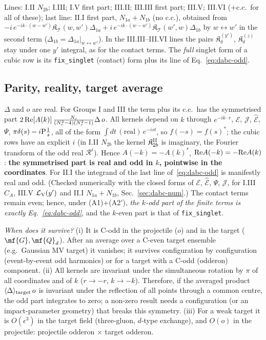 Lines: I.II $N_{2b}$; I.III; I.V first part; III.II; III.III first part; III.V; III.VI ($+$c.c.\ for all of these); last line: II.I first part, $N_{1a}+N_{1b}$ (no c.c.), obtained from $-i\,e^{-ik\cdot(w-w')}\mathfrak{K}_{\mathcal{T}}(w,w')\Delta_{1a}+i\,e^{-ik\cdot(w-w')}\mathfrak{K}_{\mathcal{T}}(w',w)\Delta_{1b}$ by $w\leftrightarrow w'$ in the second term ($\Delta_{1b}=\Delta_{1a}|_{w\leftrightarrow w'}$). In the III.III--III.VI lines the pairs $\mathfrak{K}^{(y')}_{\delta}$, $\mathfrak{K}^{(z)}_{\delta}$ stay under one $y'$ integral, as for the contact terms. The \emph{full} singlet form of a cubic row is its \texttt{fix\_singlet} (contact) form plus its line of Eq.~\eqref{eq:dabc-odd}.

\subsection{Parity, reality, target average}\label{sec:dabc-parity}
\noindent $\Delta$ and $o$ are real. For Groups I and III the term plus its c.c.\ has the symmetrised part $2\,{\rm Re}[A(k)]\,\frac{N_{c}}{(N_{c}^{2}-4)(N_{c}^{2}-1)}\Delta\,o$. All kernels depend on $k$ through $e^{-ik\cdot r}$, $\mathcal{E}$, $\mathcal{J}$, $\widehat{\mathcal{E}}$, $\Psi$, $\pi\delta(s)-i{\rm P}\frac1s$, all of the form $\int dt\,(\text{real})\,e^{-ist}$, so $f(-s)=f(s)^{*}$; the cubic rows have an explicit $i$ (in I.II $N_{2b}$ the kernel $\mathfrak{K}^{\rm II}_{2b}$ is imaginary, the Fourier transform of the odd real $\mathcal{R}^{i}$). Hence $A(-k)=-A(k)^{*}$, ${\rm Re}A(-k)=-{\rm Re}A(k)$: \textbf{the symmetrised part is real and odd in $k$, pointwise in the coordinates}. For II.I the integrand of the last line of~\eqref{eq:dabc-odd} is manifestly real and odd. (Checked numerically with the closed forms of $\mathcal{E}$, $\widehat{\mathcal{E}}$, $\Psi$, $\mathcal{J}$, for I.III $C_{A}$, III.V $\mathcal{L}_{\rm V}(y')$ and II.I $N_{1a}+N_{1b}$, Sec.~\ref{sec:dabc-num}.) The contact terms remain even; hence, under (A1)+(A2$'$), \emph{the $k$-odd part of the finite terms is exactly Eq.~\eqref{eq:dabc-odd}}, and the $k$-even part is that of \texttt{fix\_singlet}.\par
\noindent\emph{When does it survive?} (i) It is C-odd in the projectile ($o$) and in the target ($\mf{G},\mf{Q}_{d}$). After an average over a C-even target ensemble (e.g.\ Gaussian MV target) it vanishes; it survives configuration by configuration (event-by-event odd harmonics) or for a target with a C-odd (odderon) component. (ii) All kernels are invariant under the simultaneous rotation by $\pi$ of all coordinates and of $k$ ($r\to-r$, $k\to-k$). Therefore, if the averaged product $\langle\Delta\rangle_{\rm target}\,o$ is invariant under the reflection of all points through a common centre, the odd part integrates to zero; a non-zero result needs a configuration (or an impact-parameter geometry) that breaks this symmetry. (iii) For a weak target it is $O(\epsilon^{3})$ in the target field (three-gluon, $d$-type exchange), and $O(o)$ in the projectile: projectile odderon $\times$ target odderon.

